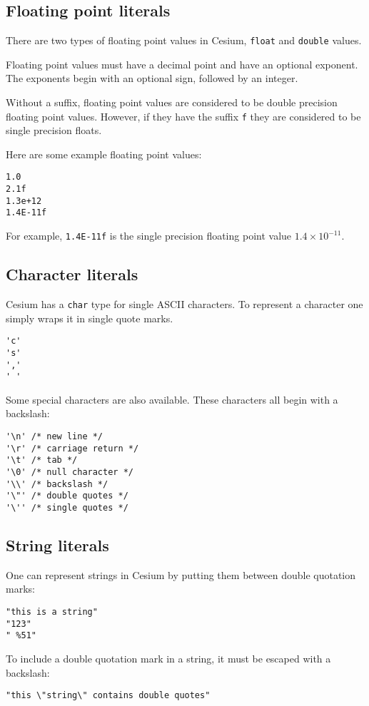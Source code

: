 \documentclass[a4paper,10pt]{article}
\newcommand{\code}{\lstinline}
\begin{document}
\subsection{Floating point literals}

There are two types of floating point values in Cesium, \code{float} and \code{double} values.

Floating point values must have a decimal point and have an optional exponent. The exponents 
begin with an optional sign, followed by an integer. 

Without a suffix, floating point values are considered to be double precision floating point 
values. However, if they have the suffix \code{f} they are considered to be single precision 
floats.

Here are some example floating point values:

\begin{lstlisting}
1.0
2.1f
1.3e+12
1.4E-11f
\end{lstlisting}

For example, \code{1.4E-11f} is the single precision floating point value $1.4\times 10^{-11}$.

\subsection{Character literals}

Cesium has a \code{char} type for single ASCII characters. To represent a character one simply
wraps it in single quote marks.

\begin{lstlisting}
'c'
's'
','
' '
\end{lstlisting}

Some special characters are also available. These characters all begin with a backslash:

\begin{lstlisting}
'\n' /* new line */
'\r' /* carriage return */
'\t' /* tab */
'\0' /* null character */
'\\' /* backslash */
'\"' /* double quotes */
'\'' /* single quotes */
\end{lstlisting}

\subsection{String literals}

One can represent strings in Cesium by putting them between double quotation marks:

\begin{lstlisting}
"this is a string"
"123"
" %51"
\end{lstlisting}

To include a double quotation mark in a string, it must be escaped with a backslash:

\begin{lstlisting}
"this \"string\" contains double quotes"
\end{lstlisting}
\end{document}
